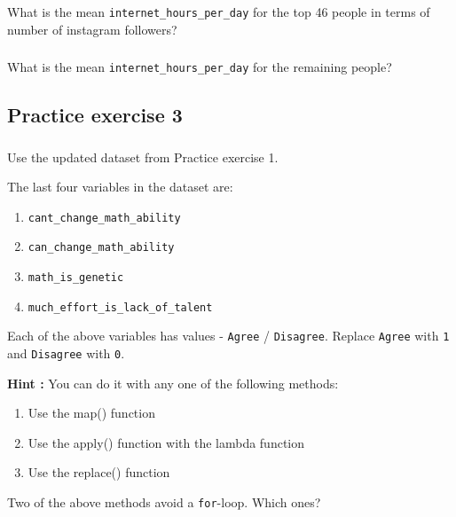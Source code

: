 \documentclass[
  letterpaper,
  DIV=11,
  numbers=noendperiod]{scrreprt}
\begin{document}
What is the mean \texttt{internet\_hours\_per\_day} for the top 46
people in terms of number of instagram followers?

\hypertarget{section-38}{%
\subsubsection{}\label{section-38}}

What is the mean \texttt{internet\_hours\_per\_day} for the remaining
people?

\hypertarget{practice-exercise-3-2}{%
\subsection{Practice exercise 3}\label{practice-exercise-3-2}}

\hypertarget{section-39}{%
\subsubsection{}\label{section-39}}

Use the updated dataset from Practice exercise 1.

The last four variables in the dataset are:

\begin{enumerate}
\def\labelenumi{\arabic{enumi}.}
\item
  \texttt{cant\_change\_math\_ability}
\item
  \texttt{can\_change\_math\_ability}
\item
  \texttt{math\_is\_genetic}
\item
  \texttt{much\_effort\_is\_lack\_of\_talent}
\end{enumerate}

Each of the above variables has values - \texttt{Agree} /
\texttt{Disagree}. Replace \texttt{Agree} with \texttt{1} and
\texttt{Disagree} with \texttt{0}.

\textbf{Hint :} You can do it with any one of the following methods:

\begin{enumerate}
\def\labelenumi{\arabic{enumi}.}
\item
  Use the map() function
\item
  Use the apply() function with the lambda function
\item
  Use the replace() function
\end{enumerate}

Two of the above methods avoid a \texttt{for}-loop. Which ones?
\end{document}
